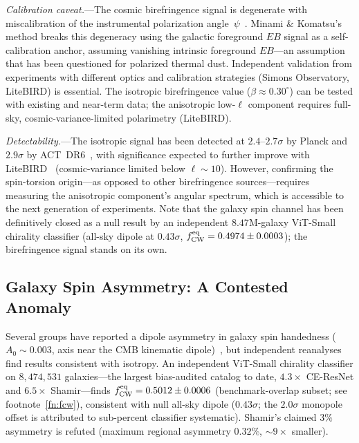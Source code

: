 \documentclass[aps,prd,twocolumn,superscriptaddress,showpacs,preprintnumbers,nofootinbib,longbibliography,floatfix]{revtex4-2}
\newcommand{\fcw}{f_{\rm CW}}
\begin{document}
\textit{Calibration caveat.}---The cosmic birefringence signal is degenerate with miscalibration of the instrumental polarization angle~$\psi$~\cite{Minami2020}. Minami \& Komatsu's method breaks this degeneracy using the galactic foreground $EB$ signal as a self-calibration anchor, assuming vanishing intrinsic foreground $EB$---an assumption that has been questioned for polarized thermal dust. Independent validation from experiments with different optics and calibration strategies (Simons Observatory, LiteBIRD) is essential. The isotropic birefringence value ($\beta\approx 0.30^\circ$) can be tested with existing and near-term data; the anisotropic low-$\ell$ component requires full-sky, cosmic-variance-limited polarimetry (LiteBIRD).

\textit{Detectability.}---The isotropic signal has been detected at $2.4$--$2.7\sigma$ by Planck and $2.9\sigma$ by ACT~DR6~\cite{DiegoPalazuelos2025}, with significance expected to further improve with LiteBIRD~\cite{LiteBIRD2023} (cosmic-variance limited below $\ell\sim 10$). However, confirming the spin-torsion origin---as opposed to other birefringence sources---requires measuring the anisotropic component's angular spectrum, which is accessible to the next generation of experiments. Note that the galaxy spin channel has been definitively closed as a null result by an independent $8.47$M-galaxy ViT-Small chirality classifier (all-sky dipole at $0.43\sigma$, $\fcw^{\rm eq} = 0.4974 \pm 0.0003$); the birefringence signal stands on its own.


\subsection{Galaxy Spin Asymmetry: A Contested Anomaly}\label{sec:spinobs}

Several groups have reported a dipole asymmetry in galaxy spin handedness ($A_0 \sim 0.003$, axis near the CMB kinematic dipole)~\cite{Shamir2012,Shamir2022,Longo2011}, but independent reanalyses~\cite{PatelDesmond2024,Philcox2025} find results consistent with isotropy. An independent ViT-Small chirality classifier on $8{,}474{,}531$ galaxies---the largest bias-audited catalog to date, $4.3\times$ CE-ResNet and $6.5\times$ Shamir---finds $\fcw^{\rm eq} = 0.5012 \pm 0.0006$ (benchmark-overlap subset; see footnote~\ref{fn:fcw}), consistent with null all-sky dipole ($0.43\sigma$; the $2.0\sigma$ monopole offset is attributed to sub-percent classifier systematic). Shamir's claimed $3\%$ asymmetry is refuted (maximum regional asymmetry $0.32\%$, ${\sim}9\times$ smaller).
\end{document}
